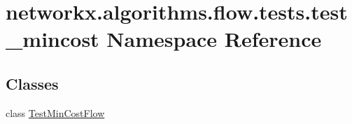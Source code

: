 \hypertarget{namespacenetworkx_1_1algorithms_1_1flow_1_1tests_1_1test__mincost}{}\section{networkx.\+algorithms.\+flow.\+tests.\+test\+\_\+mincost Namespace Reference}
\label{namespacenetworkx_1_1algorithms_1_1flow_1_1tests_1_1test__mincost}
\subsection*{Classes}
\begin{DoxyCompactItemize}
\item 
class \hyperlink{classnetworkx_1_1algorithms_1_1flow_1_1tests_1_1test__mincost_1_1TestMinCostFlow}{Test\+Min\+Cost\+Flow}
\end{DoxyCompactItemize}
